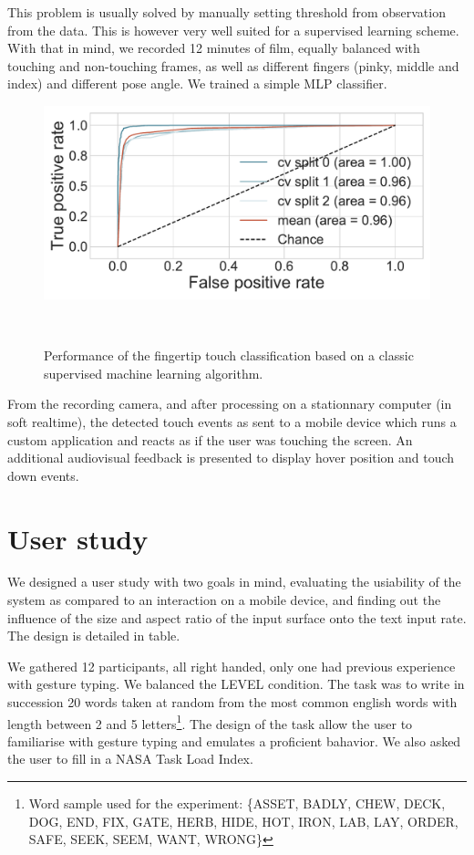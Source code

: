 \documentclass{chi-ext}
\newcommand{\cdt}[1]{{\small\uppercase{{#1}}}}
\begin{document}
This problem is usually solved by manually setting threshold from observation from the data. This is however very well suited for a supervised learning scheme. With that in mind, we recorded 12 minutes of film, equally balanced with touching and non-touching frames, as well as different fingers (pinky, middle and index) and different pose angle. We trained a simple MLP classifier.

\begin{figure}
    \centering
    \includegraphics[width=\linewidth]{figures/roc_auc.pdf}
    \caption{Performance of the fingertip touch classification based on a classic supervised machine learning algorithm.}~\label{fig:banner}
\end{figure}

From the recording camera, and after processing on a stationnary computer (in soft realtime), the detected touch events as sent to a mobile device which runs a custom application and reacts as if the user was touching the screen. An additional audiovisual feedback is presented to display hover position and touch down events.

\section{User study}
We designed a user study with two goals in mind, evaluating the usiability of the system as compared to an interaction on a mobile device, and finding out the influence of the size and aspect ratio of the input surface onto the text input rate. The design is detailed in table.

We gathered 12 participants, all right handed, only one had previous experience with gesture typing.
We  balanced the LEVEL condition. The task was to write in succession 20 words taken at random from the most common english words with length between 2 and 5 letters\footnote{Word sample used for the experiment: \{\cdt{asset}, \cdt{badly}, \cdt{chew}, \cdt{deck}, \cdt{dog}, \cdt{end}, \cdt{fix}, \cdt{gate}, \cdt{herb}, \cdt{hide}, \cdt{hot}, \cdt{iron}, \cdt{lab}, \cdt{lay}, \cdt{order}, \cdt{safe}, \cdt{seek}, \cdt{seem}, \cdt{want}, \cdt{wrong}\}}. The design of the task allow the user to familiarise with gesture typing and emulates a proficient bahavior. We also asked the user to fill in a NASA Task Load Index.
\end{document}
